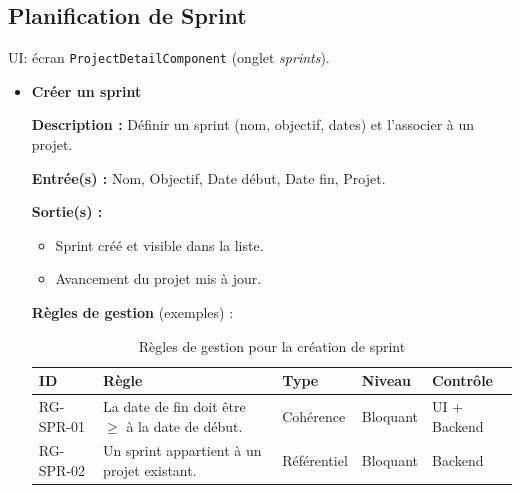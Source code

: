 \subsection{Planification de Sprint}
UI: écran \texttt{ProjectDetailComponent} (onglet \textit{sprints}).
\begin{itemize}
  \item \textbf{Créer un sprint}
  
  \textbf{Description :} Définir un sprint (nom, objectif, dates) et l’associer à un projet.
  
  \textbf{Entrée(s) :} Nom, Objectif, Date début, Date fin, Projet.
  
  \textbf{Sortie(s) :}
  \begin{itemize}
    \item Sprint créé et visible dans la liste.
    \item Avancement du projet mis à jour.
  \end{itemize}
  
  \textbf{Règles de gestion} (exemples) :
  \begin{table}[H]
    \centering
    \small
    \begin{tabular}{|l|p{6cm}|l|l|l|}
      \hline
      \textbf{ID} & \textbf{Règle} & \textbf{Type} & \textbf{Niveau} & \textbf{Contrôle} \\
      \hline
      RG-SPR-01 & La date de fin doit être \(\geq\) à la date de début. & Cohérence & Bloquant & UI + Backend \\
      \hline
      RG-SPR-02 & Un sprint appartient à un projet existant. & Référentiel & Bloquant & Backend \\
      \hline
    \end{tabular}
    \caption{Règles de gestion pour la création de sprint}
  \end{table}
\end{itemize}

